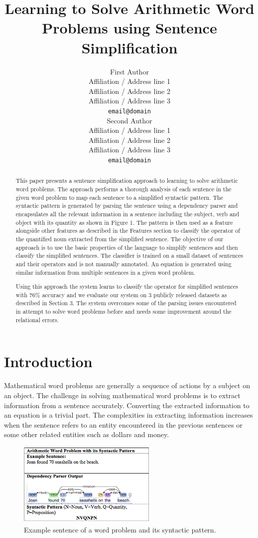 \documentclass[11pt]{article}
\title{Learning to Solve Arithmetic Word Problems using Sentence Simplification}
\author{First Author \\
  Affiliation / Address line 1 \\
  Affiliation / Address line 2 \\
  Affiliation / Address line 3 \\
  {\tt email@domain} \\\And
  Second Author \\
  Affiliation / Address line 1 \\
  Affiliation / Address line 2 \\
  Affiliation / Address line 3 \\
  {\tt email@domain} \\}
\begin{document}
\maketitle
\begin{abstract}
  This paper presents a sentence simplification approach to learning to solve arithmetic word problems. The approach performs a thorough analysis of each sentence in the given word problem to map each sentence to a simplified syntactic pattern. The syntactic pattern is generated by parsing the sentence using a dependency parser and encapsulates all the relevant information in a sentence including the subject, verb and object with its quantity as shown in Figure 1. The pattern is then used as a feature alongside other features as described in the Features section to classify the operator of the quantified noun extracted from the simplified sentence. The objective of our approach is to use the basic properties of the language to simplify sentences and then classify the simplified sentences. The classifier is trained on a small dataset of sentences and their operators and is not manually annotated. An equation is generated using similar information from multiple sentences in a given word problem.

  Using this approach the system learns to classify the operator for simplified sentences with 76\% accuracy and we evaluate our system on 3 publicly released datasets as described in Section 3. The system overcomes some of the parsing issues encountered in attempt to solve word problems before and needs some improvement around the relational errors. 
\end{abstract}
 
\section{Introduction}
\label{Intro}
Mathematical word problems are generally a sequence of actions by a subject on an object. The challenge in solving mathematical word problems is to extract information from a sentence accurately. Converting the extracted information to an equation is a trivial part. The complexities in extracting information increases when the sentence refers to an entity encountered in the previous sentences or some other related entities such as dollars and money.\newline

\begin{figure}[h]
\includegraphics[width=0.6\textwidth]{Figure1}
\centering
\caption{\label{fig:Figure1}Example sentence of a word problem and its syntactic pattern.}
\end{figure}
\end{document}
